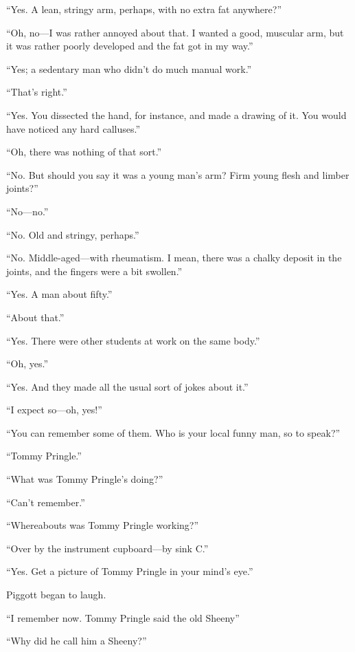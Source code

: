 \enquote{Yes. A lean, stringy arm, perhaps, with no extra fat anywhere?}

\enquote{Oh, no\allowbreak---\allowbreak I was rather annoyed about that. I wanted a good, muscular arm, but it was rather poorly developed and the fat got in my way.}

\enquote{Yes; a sedentary man who didn’t do much manual work.}

\enquote{That’s right.}

\enquote{Yes. You dissected the hand, for instance, and made a drawing of it. You would have noticed any hard calluses.}

\enquote{Oh, there was nothing of that sort.}

\enquote{No. But should you say it was a young man’s arm? Firm young flesh and limber joints?}

\enquote{No\allowbreak---\allowbreak no.}

\enquote{No. Old and stringy, perhaps.}

\enquote{No. Middle-aged\allowbreak---\allowbreak with rheumatism. I mean, there was a chalky deposit in the joints, and the fingers were a bit swollen.}

\enquote{Yes. A man about fifty.}

\enquote{About that.}

\enquote{Yes. There were other students at work on the same body.}

\enquote{Oh, yes.}

\enquote{Yes. And they made all the usual sort of jokes about it.}

\enquote{I expect so\allowbreak---\allowbreak oh, yes!}

\enquote{You can remember some of them. Who is your local funny man, so to speak?}

\enquote{Tommy Pringle.}

\enquote{What was Tommy Pringle’s doing?}

\enquote{Can’t remember.}

\enquote{Whereabouts was Tommy Pringle working?}

\enquote{Over by the instrument cupboard\allowbreak---\allowbreak by sink C.}

\enquote{Yes. Get a picture of Tommy Pringle in your mind’s eye.}

Piggott began to laugh.

\enquote{I remember now. Tommy Pringle said the old Sheeny\longdash}

\enquote{Why did he call him a Sheeny?}

